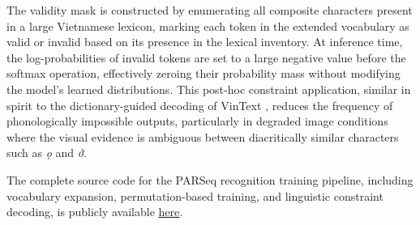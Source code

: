 The validity mask is constructed by enumerating all composite characters present in a large Vietnamese lexicon, marking each token in the extended vocabulary as valid or invalid based on its presence in the lexical inventory. At inference time, the log-probabilities of invalid tokens are set to a large negative value before the softmax operation, effectively zeroing their probability mass without modifying the model's learned distributions. This post-hoc constraint application, similar in spirit to the dictionary-guided decoding of VinText \cite{Nguyen2021}, reduces the frequency of phonologically impossible outputs, particularly in degraded image conditions where the visual evidence is ambiguous between diacritically similar characters such as \textit{ọ} and \textit{ở}.

The complete source code for the PARSeq recognition training pipeline, including vocabulary expansion, permutation-based training, and linguistic constraint decoding, is publicly available \href{https://github.com/Atunnah/Graduation_Thesis/tree/main/recog}{\underline{here}}.

